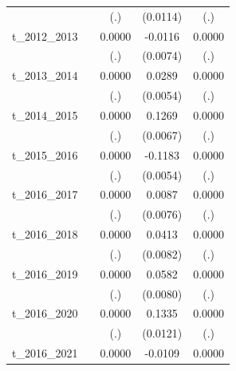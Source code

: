 \begin{table}[htbp]
\begin{tabular}{l*{4}{c}}
            &                     &         (.)         &    (0.0114)         &         (.)         \\
[1em]
t\_2012\_2013 &                     &      0.0000         &     -0.0116         &      0.0000         \\
            &                     &         (.)         &    (0.0074)         &         (.)         \\
[1em]
t\_2013\_2014 &                     &      0.0000         &      0.0289\sym{***}&      0.0000         \\
            &                     &         (.)         &    (0.0054)         &         (.)         \\
[1em]
t\_2014\_2015 &                     &      0.0000         &      0.1269\sym{***}&      0.0000         \\
            &                     &         (.)         &    (0.0067)         &         (.)         \\
[1em]
t\_2015\_2016 &                     &      0.0000         &     -0.1183\sym{***}&      0.0000         \\
            &                     &         (.)         &    (0.0054)         &         (.)         \\
[1em]
t\_2016\_2017 &                     &      0.0000         &      0.0087         &      0.0000         \\
            &                     &         (.)         &    (0.0076)         &         (.)         \\
[1em]
t\_2016\_2018 &                     &      0.0000         &      0.0413\sym{***}&      0.0000         \\
            &                     &         (.)         &    (0.0082)         &         (.)         \\
[1em]
t\_2016\_2019 &                     &      0.0000         &      0.0582\sym{***}&      0.0000         \\
            &                     &         (.)         &    (0.0080)         &         (.)         \\
[1em]
t\_2016\_2020 &                     &      0.0000         &      0.1335\sym{***}&      0.0000         \\
            &                     &         (.)         &    (0.0121)         &         (.)         \\
[1em]
t\_2016\_2021 &                     &      0.0000         &     -0.0109         &      0.0000         \\

\end{tabular}
\end{table}
